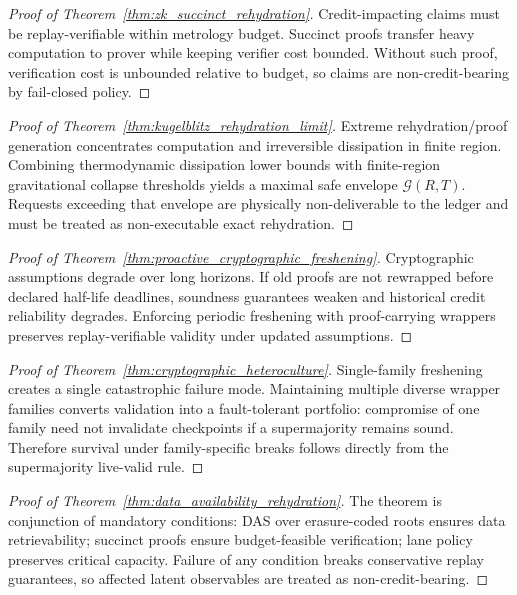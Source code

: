 \documentclass[11pt]{article}
\theoremstyle{definition}
\theoremstyle{plain}
\begin{document}
\begin{proof}[Proof of Theorem~\ref{thm:zk_succinct_rehydration}]
Credit-impacting claims must be replay-verifiable within metrology budget.
Succinct proofs transfer heavy computation to prover while keeping verifier cost bounded.
Without such proof, verification cost is unbounded relative to budget, so claims are non-credit-bearing by fail-closed policy.
\end{proof}

\begin{proof}[Proof of Theorem~\ref{thm:kugelblitz_rehydration_limit}]
Extreme rehydration/proof generation concentrates computation and irreversible dissipation in finite region.
Combining thermodynamic dissipation lower bounds with finite-region gravitational collapse thresholds yields a maximal safe envelope $\mathcal{G}(R,T)$.
Requests exceeding that envelope are physically non-deliverable to the ledger and must be treated as non-executable exact rehydration.
\end{proof}

\begin{proof}[Proof of Theorem~\ref{thm:proactive_cryptographic_freshening}]
Cryptographic assumptions degrade over long horizons.
If old proofs are not rewrapped before declared half-life deadlines, soundness guarantees weaken and historical credit reliability degrades.
Enforcing periodic freshening with proof-carrying wrappers preserves replay-verifiable validity under updated assumptions.
\end{proof}

\begin{proof}[Proof of Theorem~\ref{thm:cryptographic_heteroculture}]
Single-family freshening creates a single catastrophic failure mode.
Maintaining multiple diverse wrapper families converts validation into a fault-tolerant portfolio: compromise of one family need not invalidate checkpoints if a supermajority remains sound.
Therefore survival under family-specific breaks follows directly from the supermajority live-valid rule.
\end{proof}

\begin{proof}[Proof of Theorem~\ref{thm:data_availability_rehydration}]
The theorem is conjunction of mandatory conditions:
DAS over erasure-coded roots ensures data retrievability; succinct proofs ensure budget-feasible verification; lane policy preserves critical capacity.
Failure of any condition breaks conservative replay guarantees, so affected latent observables are treated as non-credit-bearing.
\end{proof}
\end{document}
